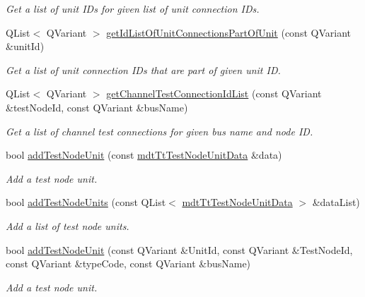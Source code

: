 \begin{DoxyCompactItemize}
\begin{DoxyCompactList}\small\item\em Get a list of unit I\-Ds for given list of unit connection I\-Ds. \end{DoxyCompactList}\item 
Q\-List$<$ Q\-Variant $>$ \hyperlink{classmdt_tt_test_node_aedbfa25bedac04b859b1cb3ef6a16510}{get\-Id\-List\-Of\-Unit\-Connections\-Part\-Of\-Unit} (const Q\-Variant \&unit\-Id)
\begin{DoxyCompactList}\small\item\em Get a list of unit connection I\-Ds that are part of given unit I\-D. \end{DoxyCompactList}\item 
Q\-List$<$ Q\-Variant $>$ \hyperlink{classmdt_tt_test_node_a07b8cd098d61c3f14d3ba226c1d1f1cb}{get\-Channel\-Test\-Connection\-Id\-List} (const Q\-Variant \&test\-Node\-Id, const Q\-Variant \&bus\-Name)
\begin{DoxyCompactList}\small\item\em Get a list of channel test connections for given bus name and node I\-D. \end{DoxyCompactList}\item 
bool \hyperlink{classmdt_tt_test_node_a9885f086f4496b49d2bc4ac299c55e89}{add\-Test\-Node\-Unit} (const \hyperlink{classmdt_tt_test_node_unit_data}{mdt\-Tt\-Test\-Node\-Unit\-Data} \&data)
\begin{DoxyCompactList}\small\item\em Add a test node unit. \end{DoxyCompactList}\item 
bool \hyperlink{classmdt_tt_test_node_ac323fd694967fb49145eb9238622c866}{add\-Test\-Node\-Units} (const Q\-List$<$ \hyperlink{classmdt_tt_test_node_unit_data}{mdt\-Tt\-Test\-Node\-Unit\-Data} $>$ \&data\-List)
\begin{DoxyCompactList}\small\item\em Add a list of test node units. \end{DoxyCompactList}\item 
bool \hyperlink{classmdt_tt_test_node_a7accbc1143114adf6c61d467b7e8e211}{add\-Test\-Node\-Unit} (const Q\-Variant \&Unit\-Id, const Q\-Variant \&Test\-Node\-Id, const Q\-Variant \&type\-Code, const Q\-Variant \&bus\-Name)
\begin{DoxyCompactList}\small\item\em Add a test node unit. \end{DoxyCompactList}\item 

\end{DoxyCompactItemize}
